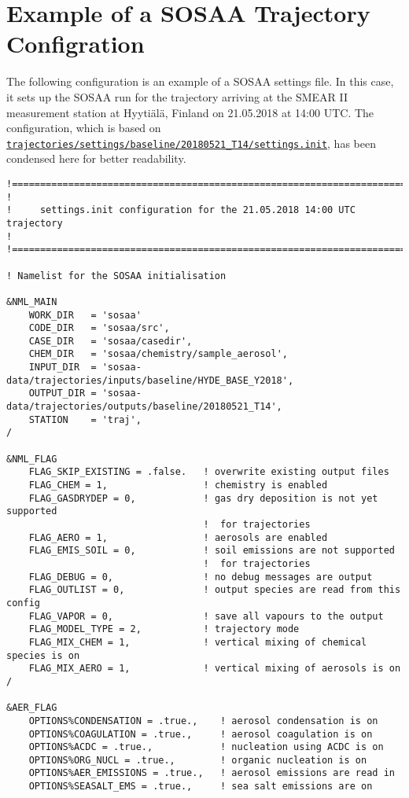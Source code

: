 \chapter{Example of a SOSAA Trajectory Configration} \label{app:sosaa-settings}

The following configuration is an example of a SOSAA settings file. In this case, it sets up the SOSAA run for the trajectory arriving at the SMEAR II measurement station at Hyyti\"al\"a, Finland \cite{smear-station-2013} on 21.05.2018 at 14:00 UTC. The configuration, which is based on \href{https://github.com/juntyr/sosaa-trajectories-dataset/blob/main/settings/baseline/20180521_T14/settings.init}{\texttt{trajectories/settings/baseline/20180521\_T14/settings.init}}, has been condensed here for better readability.

\begin{verbatim}
!==============================================================================!
!
!     settings.init configuration for the 21.05.2018 14:00 UTC trajectory
!
!==============================================================================!

! Namelist for the SOSAA initialisation

&NML_MAIN
    WORK_DIR   = 'sosaa'
    CODE_DIR   = 'sosaa/src',
    CASE_DIR   = 'sosaa/casedir',
    CHEM_DIR   = 'sosaa/chemistry/sample_aerosol',
    INPUT_DIR  = 'sosaa-data/trajectories/inputs/baseline/HYDE_BASE_Y2018',
    OUTPUT_DIR = 'sosaa-data/trajectories/outputs/baseline/20180521_T14',
    STATION    = 'traj',
/

&NML_FLAG
    FLAG_SKIP_EXISTING = .false.   ! overwrite existing output files
    FLAG_CHEM = 1,                 ! chemistry is enabled
    FLAG_GASDRYDEP = 0,            ! gas dry deposition is not yet supported
                                   !  for trajectories
    FLAG_AERO = 1,                 ! aerosols are enabled
    FLAG_EMIS_SOIL = 0,            ! soil emissions are not supported
                                   !  for trajectories
    FLAG_DEBUG = 0,                ! no debug messages are output
    FLAG_OUTLIST = 0,              ! output species are read from this config
    FLAG_VAPOR = 0,                ! save all vapours to the output
    FLAG_MODEL_TYPE = 2,           ! trajectory mode
    FLAG_MIX_CHEM = 1,             ! vertical mixing of chemical species is on
    FLAG_MIX_AERO = 1,             ! vertical mixing of aerosols is on
/

&AER_FLAG
    OPTIONS%CONDENSATION = .true.,    ! aerosol condensation is on
    OPTIONS%COAGULATION = .true.,     ! aerosol coagulation is on
    OPTIONS%ACDC = .true.,            ! nucleation using ACDC is on
    OPTIONS%ORG_NUCL = .true.,        ! organic nucleation is on
    OPTIONS%AER_EMISSIONS = .true.,   ! aerosol emissions are read in
    OPTIONS%SEASALT_EMS = .true.,     ! sea salt emissions are on


\end{verbatim}
